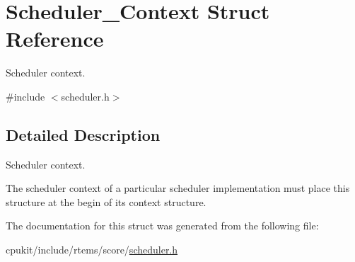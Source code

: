 \hypertarget{structScheduler__Context}{}\section{Scheduler\+\_\+\+Context Struct Reference}
\label{structScheduler__Context}


Scheduler context.  




{\ttfamily \#include $<$scheduler.\+h$>$}



\subsection{Detailed Description}
Scheduler context. 

The scheduler context of a particular scheduler implementation must place this structure at the begin of its context structure. 

The documentation for this struct was generated from the following file\+:\begin{DoxyCompactItemize}
\item 
cpukit/include/rtems/score/\mbox{\hyperlink{score_2scheduler_8h}{scheduler.\+h}}\end{DoxyCompactItemize}
